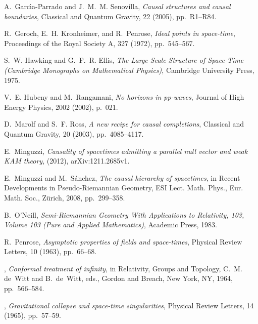 \documentclass[11pt]{article}
\begin{document}
\begin{thebibliography}{10}
{\sc A.~Garc{\'\i}a-Parrado and J.~M.~M. Senovilla}, {\em Causal structures and
  causal boundaries}, Classical and Quantum Gravity, 22 (2005), pp.~R1--R84.

{\sc R.~Geroch, E.~H. Kronheimer, and R.~Penrose}, {\em Ideal points in
  space-time}, Proceedings of the Royal Society A, 327 (1972), pp.~545--567.

{\sc S.~W. Hawking and G.~F.~R. Ellis}, {\em The {{Large Scale Structure}} of
  {{Space}}-{{Time}} ({{Cambridge Monographs}} on {{Mathematical Physics}})},
  {Cambridge University Press}, 1975.

{\sc V.~E. Hubeny and M.~Rangamani}, {\em No horizons in pp-waves}, Journal of
  High Energy Physics, 2002 (2002), p.~021.

{\sc D.~Marolf and S.~F. Ross}, {\em A new recipe for causal completions},
  Classical and Quantum Gravity, 20 (2003), pp.~4085--4117.

{\sc E.~Minguzzi}, {\em {Causality of spacetimes admitting a parallel null
  vector and weak KAM theory}},  (2012), arXiv:1211.2685v1.

{\sc E.~Minguzzi and M.~S{\'a}nchez}, {\em The causal hierarchy of spacetimes},
  in Recent Developments in Pseudo-{{Riemannian}} Geometry, ESI Lect. Math.
  Phys., {Eur. Math. Soc., Z{\"u}rich}, 2008, pp.~299--358.

{\sc B.~O'Neill}, {\em Semi-{{Riemannian Geometry With Applications}} to
  {{Relativity}}, 103, {{Volume}} 103 ({{Pure}} and {{Applied Mathematics}})},
  {Academic Press}, 1983.

{\sc R.~Penrose}, {\em Asymptotic properties of fields and space-times},
  Physical Review Letters, 10 (1963), pp.~66--68.

\leavevmode\vrule height 2pt depth -1.6pt width 23pt, {\em Conformal treatment
  of infinity}, in Relativity, {{Groups}} and {{Topology}}, C.~M. de~Witt and
  B.~de~Witt, eds., {Gordon and Breach}, New York, NY, 1964, pp.~566--584.

\leavevmode\vrule height 2pt depth -1.6pt width 23pt, {\em Gravitational
  collapse and space-time singularities}, Physical Review Letters, 14 (1965),
  pp.~57--59.


\end{thebibliography}
\end{document}
